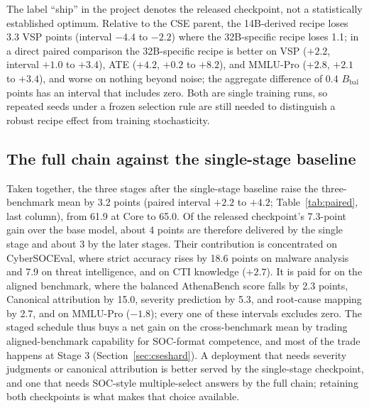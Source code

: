 \documentclass[a4paper,fleqn]{cas-dc}
\newcommand{\Bbal}{B_{\mathrm{bal}}}
\begin{document}
The label ``ship'' in the project denotes the released checkpoint, not a statistically established optimum. Relative to the CSE parent, the 14B-derived recipe loses 3.3 VSP points (interval $-4.4$ to $-2.2$) where the 32B-specific recipe loses 1.1; in a direct paired comparison the 32B-specific recipe is better on VSP ($+2.2$, interval $+1.0$ to $+3.4$), ATE ($+4.2$, $+0.2$ to $+8.2$), and MMLU-Pro ($+2.8$, $+2.1$ to $+3.4$), and worse on nothing beyond noise; the aggregate difference of 0.4 $\Bbal$ points has an interval that includes zero. Both are single training runs, so repeated seeds under a frozen selection rule are still needed to distinguish a robust recipe effect from training stochasticity.

\subsection{The full chain against the single-stage baseline}\label{sec:fullchain}
Taken together, the three stages after the single-stage baseline raise the three-benchmark mean by 3.2 points (paired interval $+2.2$ to $+4.2$; Table~\ref{tab:paired}, last column), from 61.9 at Core to 65.0. Of the released checkpoint's 7.3-point gain over the base model, about 4 points are therefore delivered by the single stage and about 3 by the later stages. Their contribution is concentrated on CyberSOCEval, where strict accuracy rises by 18.6 points on malware analysis and 7.9 on threat intelligence, and on CTI knowledge ($+2.7$). It is paid for on the aligned benchmark, where the balanced AthenaBench score falls by 2.3 points, Canonical attribution by 15.0, severity prediction by 5.3, and root-cause mapping by 2.7, and on MMLU-Pro ($-1.8$); every one of these intervals excludes zero. The staged schedule thus buys a net gain on the cross-benchmark mean by trading aligned-benchmark capability for SOC-format competence, and most of the trade happens at Stage 3 (Section~\ref{sec:cseshard}). A deployment that needs severity judgments or canonical attribution is better served by the single-stage checkpoint, and one that needs SOC-style multiple-select answers by the full chain; retaining both checkpoints is what makes that choice available.
\end{document}

